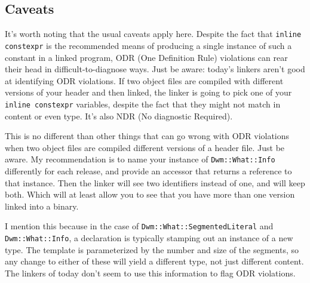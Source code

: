 \subsection{Caveats}
It's worth noting that the usual caveats apply here.  Despite the fact that
\texttt{inline constexpr} is the recommended means of producing a single
instance of such a constant in a linked program, ODR (One Definition Rule)
violations can rear their head in difficult-to-diagnose ways.  Just be aware:
today's linkers aren't good at identifying ODR violations.  If two object
files are compiled with different versions of your header and then linked,
the linker is going to pick one of your \texttt{inline constexpr} variables,
despite the fact that they might not match in content or even type.
It's also NDR (No diagnostic Required).

This is no different than other things that can go wrong with ODR
violations when two object files are compiled different versions of a
header file.  Just be aware.  My recommendation is to name your
instance of \texttt{Dwm::What::Info} differently for each release, and
provide an accessor that returns a reference to that instance.  Then
the linker will see two identifiers instead of one, and will keep
both.  Which will at least allow you to see that you have more than
one version linked into a binary.

I mention this because in the case of
\texttt{Dwm::What::SegmentedLiteral} and \texttt{Dwm::What::Info}, a
declaration is typically stamping out an instance of a new type.  The
template is parameterized by the number and size of the segments, so
any change to either of these will yield a different type, not just
different content.  The linkers of today don't seem to use this
information to flag ODR violations.
